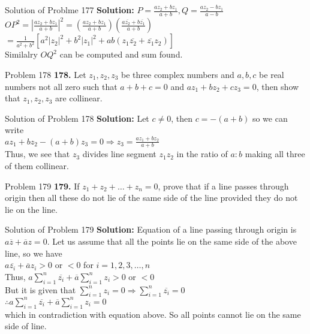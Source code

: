 \documentclass[aspectratio=169,8pt]{beamer}
\begin{document}
\begin{frame}{Solution of Problme 177}
  \textbf{Solution:} $P = \frac{az_2 + bz_1}{a + b}, Q = \frac{az_2 - bz_1}{a - b}$\\
  \vspace*{0.2cm}
  $OP^2 = \left|\frac{az_2 + bz_1}{a + b}\right|^2 = \left(\frac{az_2 + bz_1}{a + b}\right)\left(\frac{a\overline{z_2} +
    b\overline{z_1}}{a + b}\right)$\\
  \vspace*{0.2cm}
  $= \frac{1}{a^2 + b^2}[a^2|z_2|^2 + b^2|z_1|^2 + ab(z_1\overline{z_2} + \overline{z_1}z_2)]$\\
  \vspace*{0.2cm}
  Similalry $OQ^2$ can be computed and sum found.
\end{frame}
\begin{frame}{Problem 178}
  \textbf{178.} Let $z_1, z_2, z_3$ be three complex numbers and $a, b, c$ be real numbers not all zero such that $a + b + c = 0$
  and $az_1 + bz_2 + cz_3 = 0$, then show that $z_1, z_2, z_3$ are collinear.
\end{frame}
\begin{frame}{Solution of Problem 178}
  \textbf{Solution:} Let $c\neq 0$, then $c = -(a + b)$ so we can write\\
  \vspace*{0.2cm}
  $az_1 + bz_2 - (a + b)z_3 = 0 \Rightarrow z_3 = \frac{az_1 + bz_2}{a + b}$\\
  \vspace*{0.2cm}
  Thus, we see that $z_3$ divides line segment $z_1z_2$ in the ratio of $a:b$ making all three of them collinear.
\end{frame}
\begin{frame}{Problem 179}
  \textbf{179.} If $z_1 + z_2 + \ldots + z_n = 0$, prove that if a line passes through origin then all these do not lie of the same
  side of the line provided they do not lie on the line.
\end{frame}
\begin{frame}{Solution of Problem 179}
  \textbf{Solution:} Equation of a line passing through origin is $a\overline{z} + \overline{a}z = 0$. Let us assume that all the
  points lie on the same side of the above line, so we have\\
  \vspace*{0.2cm}
  $a\overline{z_i} + \overline{a}z_i > 0$ or $< 0$ for $i = 1, 2, 3, \ldots, n$\\
  \vspace*{0.2cm}
  Thus, $a\sum_{i = 1}^n\overline{z_i} + \overline{a}\sum_{i = 1}^nz_i > 0$ or $< 0$\\
  \vspace*{0.2cm}
  But it is given that $\sum_{i = 1}^n z_i = 0 \Rightarrow \sum_{i = 1}^n \overline{z_i} = 0$\\
      \vspace*{0.2cm}
      $\therefore a\sum_{i =1}^n\overline{z_i} + \overline{a}\sum_{i = 1}^nz_i = 0$\\
      \vspace*{0.2cm}
      which in contradiction with equation above. So all points cannot lie on the same side of line.
\end{frame}
\end{document}
